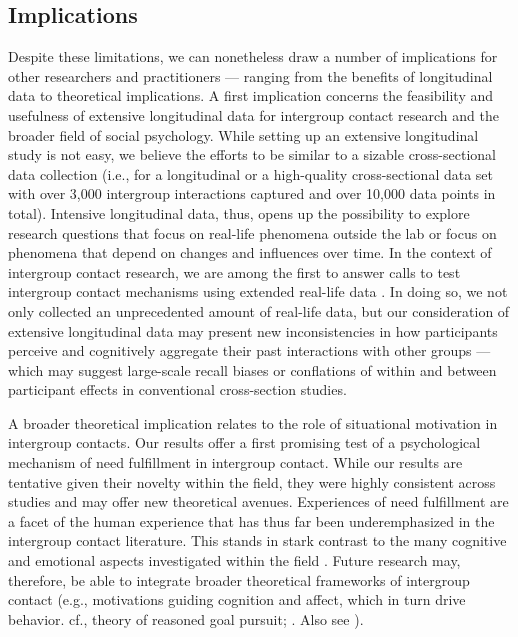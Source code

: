 \documentclass[man, 12pt, a4paper, mask]{apa7}
\theoremstyle{break}
\theoremstyle{plain}
\begin{document}
\subsection{Implications}
Despite these limitations, we can nonetheless draw a number of implications for other researchers and practitioners --- ranging from the benefits of longitudinal data to theoretical implications. A first implication concerns the feasibility and usefulness of extensive longitudinal data for intergroup contact research and the broader field of social psychology. While setting up an extensive longitudinal study is not easy, we believe the efforts to be similar to a sizable cross-sectional data collection (i.e., for a longitudinal or a high-quality cross-sectional data set with over 3,000 intergroup interactions captured and over 10,000 data points in total). Intensive longitudinal data, thus, opens up the possibility to explore research questions that focus on real-life phenomena outside the lab or focus on phenomena that depend on changes and influences over time. In the context of intergroup contact research, we are among the first to answer calls to test intergroup contact mechanisms using extended real-life data \citep[e.g.,][]{Pettigrew2011, MacInnis2015}. In doing so, we not only collected an unprecedented amount of real-life data, but our consideration of extensive longitudinal data may present new inconsistencies in how participants perceive and cognitively aggregate their past interactions with other groups — which may suggest large-scale recall biases or conflations of within and between participant effects in conventional cross-section studies.

A broader theoretical implication relates to the role of situational motivation in intergroup contacts. Our results offer a first promising test of a psychological mechanism of need fulfillment in intergroup contact. While our results are tentative given their novelty within the field, they were highly consistent across studies and may offer new theoretical avenues. Experiences of need fulfillment are a facet of the human experience that has thus far been underemphasized in the intergroup contact literature. This stands in stark contrast to the many cognitive \citep[e.g.,][]{Pettigrew1998, Brown2005} and emotional aspects investigated within the field \citep[e.g.,][]{Stephan2008}. Future research may, therefore, be able to integrate broader theoretical frameworks of intergroup contact (e.g., motivations guiding cognition and affect, which in turn drive behavior. cf., theory of reasoned goal pursuit; \citealp{Ajzen2019}. Also see \citealp{kreienkamp2022d}). 
\end{document}
